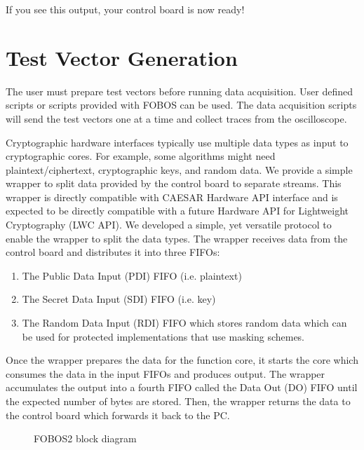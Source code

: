 \documentclass[letterpaper,10pt,english]{sphinxmanual}
\let\sphinxpxdimen\pdfpxdimen\else\newdimen\sphinxpxdimen
\begin{document}
If you see this output, your control board is now ready!


\chapter{Test Vector Generation}
\label{\detokenize{tvgen:test-vector-generation}}\label{\detokenize{tvgen:tvgen-label}}\label{\detokenize{tvgen::doc}}
The user must prepare test vectors before running data acquisition. User defined scripts or scripts provided with FOBOS can be used.
The data acquisition scripts will send the test vectors one at a time and collect traces from the oscilloscope.

Cryptographic hardware interfaces typically use multiple data types as input to cryptographic cores.
For example, some algorithms might need plaintext/ciphertext, cryptographic keys, and random data.
We provide a simple wrapper to split data provided by the control board to separate streams.
This wrapper is directly compatible with CAESAR Hardware API interface and is expected to be directly compatible with a future Hardware API for Lightweight Cryptography (LWC API).
We developed a simple, yet versatile protocol to enable the wrapper to split the data types.
The wrapper receives data from the control board and distributes it into three FIFOs:
\begin{enumerate}
%
\item {} 
The Public Data Input (PDI) FIFO (i.e. plaintext)

\item {} 
The Secret Data Input (SDI) FIFO (i.e. key)

\item {} 
The Random Data Input (RDI) FIFO which stores random data which can be used for protected implementations that use masking schemes.

\end{enumerate}

Once the wrapper prepares the data for the function core, it starts the core which consumes the data in the input FIFOs and produces output.
The wrapper accumulates the output into a fourth FIFO called the Data Out (DO) FIFO until the expected number of bytes are stored.
Then, the wrapper returns the data to the control board which forwards it back to the PC.

\begin{figure}[htbp]
\centering
\capstart

\noindent\sphinxincludegraphics[height=300\sphinxpxdimen]{{fobos2-block}.png}
\caption{FOBOS2 block diagram}\label{\detokenize{tvgen:id1}}\end{figure}
\end{document}
